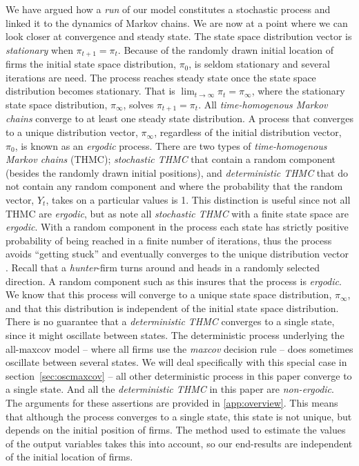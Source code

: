 \documentclass[preprint, 12pt]{elsarticle}
\begin{document}
We have argued how a \emph{run} of our model constitutes a stochastic process and linked it to the dynamics of Markov chains. We are now at a point where we can look closer at convergence and steady state. The state space distribution vector is \emph{stationary} when $\pi_{t+1} = \pi_t$. Because of the randomly drawn initial location of firms the initial state space distribution, $\pi_0$, is seldom stationary and several iterations are need. The process reaches steady state once the state space distribution becomes stationary. That is $\lim_{t \to \infty} \pi_t = \pi_\infty$, where the stationary state space distribution, $\pi_\infty$, solves $\pi_{t+1} = \pi_t$. All \emph{time-homogenous Markov chains} converge to at least one steady state distribution. A process that converges to a unique distribution vector, $\pi_\infty$, regardless of the initial distribution vector, $\pi_0$, is known as an \emph{ergodic} process. There are two types of \emph{time-homogenous Markov chains} (THMC); \emph{stochastic THMC} that contain a random component (besides the randomly drawn initial positions), and \emph{deterministic THMC} that do not contain any random component and where the probability that the random vector, $Y_t$, takes on a particular values is 1. This distinction is useful since not all THMC are \emph{ergodic}, but as \citet[chapter~4, p.~64]{Laver_Sergenti_2011} note all \emph{stochastic THMC} with a finite state space are \emph{ergodic}. With a random component in the process each state has strictly positive probability of being reached in a finite number of iterations, thus the process avoids ``getting stuck'' and eventually converges to the unique distribution vector \citep[chapter~4, p.~71]{Laver_Sergenti_2011}. Recall that a \emph{hunter}-firm turns around and heads in a randomly selected direction. A random component such as this insures that the process is \emph{ergodic}. We know that this process will converge to a unique state space distribution, $\pi_\infty$, and that this distribution is independent of the initial state space distribution. There is no guarantee that a \emph{deterministic THMC} converges to a single state, since it might oscillate between states. The deterministic process underlying the all-maxcov model -- where all firms use the \emph{maxcov} decision rule -- does sometimes oscillate between several states. We will deal specifically with this special case in section~\ref{sec:oscmaxcov} -- all other deterministic process in this paper converge to a single state. And all the \emph{deterministic THMC} in this paper are \emph{non-ergodic}. The arguments for these assertions are provided in \ref{app:overview}. This means that although the process converges to a single state, this state is not unique, but depends on the initial position of firms. The method used to estimate the values of the output variables takes this into account, so our end-results are independent of the initial location of firms.
\end{document}
